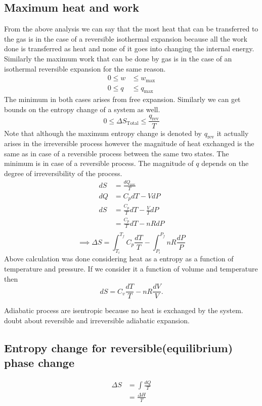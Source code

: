 \documentclass[12pt]{article}
\begin{document}
\subsection{Maximum heat and work}
From the above analysis we can say that the most heat that can be transferred to the gas is in the case of a reversible isothermal expansion because all the work done is transferred as heat and none of it goes into changing the internal energy. Similarly the maximum work that can be done by gas is in the case of an isothermal reversible expansion for the same reason. 
\begin{align}
	0\leq w&\leq w_{\text{max}}\\
    0\leq q&\leq q_{\text{max}}
\end{align}
The minimum in both cases arises from free expansion. Similarly we can get bounds on the entropy change of a system as well. 
\begin{equation}
	\boxed{0\leq \Delta S_{\text{Total}}\leq \frac{q_{\text{rev}}}{T}}
\end{equation} 
Note that although the maximum entropy change is denoted by $q_{\text{rev}}$ it actually arises in the irreversible process however the magnitude of heat exchanged is the same as in case of a reversible process between the same two states. The minimum is in case of a reversible process. The magnitude of $q$ depends on the degree of irreversibility of the process. 
\begin{align}
	dS&=\frac{dQ_{\text{rev}}}{T}\\
    dQ&=C_pdT-VdP\\
    dS&=\frac{C_p}{T}dT-\frac{V}{T}dP\\
      &=\frac{C_p}{T}dT-nRdP\\
\end{align}
\begin{equation}
	\implies \boxed{\Delta S= \int_{T_i}^{T_f}C_p \frac{dT}{T}-\int_{P_i}^{P_f}nR \frac{dP}{P}}
\end{equation}
 Above calculation was done considering heat as a entropy as a function of temperature and pressure. If we consider it a function of volume and temperature then
 \begin{equation}
 	dS=C_v\frac{dT}{T}-nR\frac{dV}{V}.
 \end{equation}

Adiabatic process are isentropic because no heat is exchanged by the system. 
{\color{red}doubt about reversible and irreversible adiabatic expansion.}
\subsection{Entropy change for reversible(equilibrium) phase change}
\begin{align}
	\Delta S&=\int \frac{dQ}{T}\\
	        &=\frac{\Delta H}{T}
\end{align}
\end{document}
